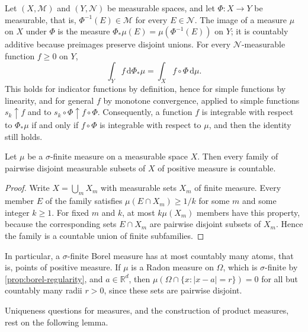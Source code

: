 Let $(X,\mathcal M)$ and $(Y,\mathcal N)$ be measurable spaces, and let $\Phi\colon X\to Y$ be measurable, that is, $\Phi^{-1}(E)\in\mathcal M$ for every $E\in\mathcal N$. The image of a measure $\mu$ on $X$ under $\Phi$ is the measure $\Phi_*\mu(E)=\mu(\Phi^{-1}(E))$ on $Y$; it is countably additive because preimages preserve disjoint unions. For every $\mathcal N$-measurable function $f\geq0$ on $Y$,
\[
 \int_Yf\,\mathrm d\Phi_*\mu=\int_Xf\circ\Phi\,\mathrm d\mu.
\]
This holds for indicator functions by definition, hence for simple functions by linearity, and for general $f$ by monotone convergence, applied to simple functions $s_k\uparrow f$ and to $s_k\circ\Phi\uparrow f\circ\Phi$. Consequently, a function $f$ is integrable with respect to $\Phi_*\mu$ if and only if $f\circ\Phi$ is integrable with respect to $\mu$, and then the identity still holds.

\begin{lemma}\label{lem:disjoint-positive-countable}
Let $\mu$ be a $\sigma$-finite measure on a measurable space $X$. Then every family of pairwise disjoint measurable subsets of $X$ of positive measure is countable.
\end{lemma}
\begin{proof}
Write $X=\bigcup_mX_m$ with measurable sets $X_m$ of finite measure. Every member $E$ of the family satisfies $\mu(E\cap X_m)\geq1/k$ for some $m$ and some integer $k\geq1$. For fixed $m$ and $k$, at most $k\mu(X_m)$ members have this property, because the corresponding sets $E\cap X_m$ are pairwise disjoint subsets of $X_m$. Hence the family is a countable union of finite subfamilies.
\end{proof}

In particular, a $\sigma$-finite Borel measure has at most countably many atoms, that is, points of positive measure. If $\mu$ is a Radon measure on $\Omega$, which is $\sigma$-finite by \cref{prop:borel-regularity}, and $a\in\mathbb R^d$, then $\mu(\Omega\cap\{x:|x-a|=r\})=0$ for all but countably many radii $r>0$, since these sets are pairwise disjoint.

Uniqueness questions for measures, and the construction of product measures, rest on the following lemma.

